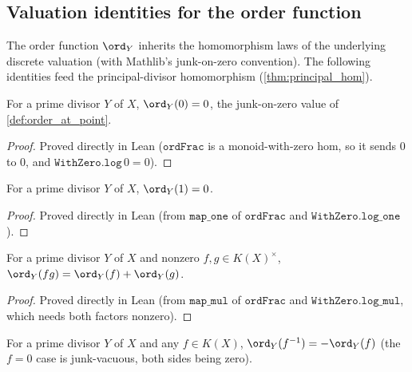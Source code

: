 \subsection{Valuation identities for the order function}
\label{subsec:order_identities}
The order function \(\ord_Y\) inherits the homomorphism laws of the
underlying discrete valuation (with Mathlib's junk-on-zero convention). The
following identities feed the principal-divisor homomorphism
(\ref{thm:principal_hom}).
\begin{lemma}
  \label{lem:order_zero}
  For a prime divisor \(Y\) of \(X\), \(\ord_Y(0) = 0\), the junk-on-zero
  value of \ref{def:order_at_point}.
\end{lemma}
\begin{proof}
  Proved directly in Lean (\(\texttt{ordFrac}\) is a monoid-with-zero hom,
  so it sends \(0\) to \(0\), and \(\texttt{WithZero.log}\,0 = 0\)).
\end{proof}
\begin{lemma}
  \label{lem:order_one}
  For a prime divisor \(Y\) of \(X\), \(\ord_Y(1) = 0\).
\end{lemma}
\begin{proof}
  Proved directly in Lean (from \(\texttt{map\_one}\) of \(\texttt{ordFrac}\)
  and \(\texttt{WithZero.log\_one}\)).
\end{proof}
\begin{lemma}
  \label{lem:order_mul_of_ne_zero}
  For a prime divisor \(Y\) of \(X\) and nonzero
  \(f, g \in K(X)^{\times}\),
  \(\ord_Y(fg) = \ord_Y(f) + \ord_Y(g)\).
\end{lemma}
\begin{proof}
  Proved directly in Lean (from \(\texttt{map\_mul}\) of \(\texttt{ordFrac}\)
  and \(\texttt{WithZero.log\_mul}\), which needs both factors nonzero).
\end{proof}
\begin{lemma}
  \label{lem:order_inv}
  For a prime divisor \(Y\) of \(X\) and any \(f \in K(X)\),
  \(\ord_Y(f^{-1}) = -\ord_Y(f)\) (the \(f = 0\) case is junk-vacuous, both
  sides being zero).
\end{lemma}
